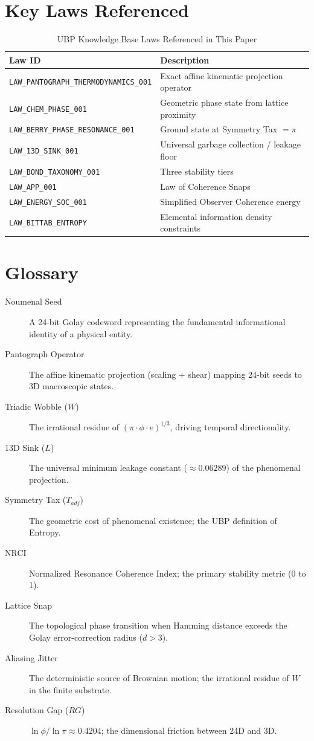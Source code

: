 \documentclass[12pt,a4paper]{article}
\begin{document}
\section{Key Laws Referenced}

\begin{table}[H]
\centering
\caption{UBP Knowledge Base Laws Referenced in This Paper}
\begin{tabular}{@{}ll@{}}
\toprule
\textbf{Law ID} & \textbf{Description} \\
\midrule
\texttt{LAW\_PANTOGRAPH\_THERMODYNAMICS\_001} & Exact affine kinematic projection operator \\
\texttt{LAW\_CHEM\_PHASE\_001} & Geometric phase state from lattice proximity \\
\texttt{LAW\_BERRY\_PHASE\_RESONANCE\_001} & Ground state at Symmetry Tax $= \pi$ \\
\texttt{LAW\_13D\_SINK\_001} & Universal garbage collection / leakage floor \\
\texttt{LAW\_BOND\_TAXONOMY\_001} & Three stability tiers \\
\texttt{LAW\_APP\_001} & Law of Coherence Snaps \\
\texttt{LAW\_ENERGY\_SOC\_001} & Simplified Observer Coherence energy \\
\texttt{LAW\_BITTAB\_ENTROPY} & Elemental information density constraints \\
\bottomrule
\end{tabular}
\end{table}

\section{Glossary}

\begin{description}
\item[Noumenal Seed] A 24-bit Golay codeword representing the fundamental informational identity of a physical entity.
\item[Pantograph Operator] The affine kinematic projection (scaling + shear) mapping 24-bit seeds to 3D macroscopic states.
\item[Triadic Wobble ($W$)] The irrational residue of $(\pi \cdot \phi \cdot e)^{1/3}$, driving temporal directionality.
\item[13D Sink ($L$)] The universal minimum leakage constant ($\approx 0.06289$) of the phenomenal projection.
\item[Symmetry Tax ($T_{adj}$)] The geometric cost of phenomenal existence; the UBP definition of Entropy.
\item[NRCI] Normalized Resonance Coherence Index; the primary stability metric (0 to 1).
\item[Lattice Snap] The topological phase transition when Hamming distance exceeds the Golay error-correction radius ($d > 3$).
\item[Aliasing Jitter] The deterministic source of Brownian motion; the irrational residue of $W$ in the finite substrate.
\item[Resolution Gap ($RG$)] $\ln\phi / \ln\pi \approx 0.4204$; the dimensional friction between 24D and 3D.
\end{description}
\end{document}
